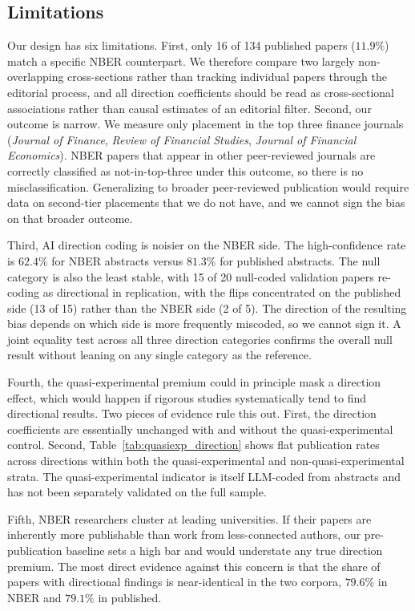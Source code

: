 \documentclass[12pt]{article}
\newcommand{\JF}{\textit{Journal of Finance}}
\newcommand{\RFS}{\textit{Review of Financial Studies}}
\newcommand{\JFE}{\textit{Journal of Financial Economics}}
\begin{document}
\subsection{Limitations}
\label{subsec:limitations}

Our design has six limitations.  First, only 16 of 134
published papers ($11.9\%$) match a specific NBER counterpart.  We
therefore compare two largely non-overlapping cross-sections rather
than tracking individual papers through the editorial process, and
all direction coefficients should be read as cross-sectional
associations rather than causal estimates of an editorial filter.
Second, our outcome is narrow.  We measure only placement in the top
three finance journals (\JF{}, \RFS{}, \JFE{}).  NBER papers that appear
in other peer-reviewed journals are correctly classified as
not-in-top-three under this outcome, so there is no
misclassification.  Generalizing to broader peer-reviewed
publication would require data on second-tier placements that we do
not have, and we cannot sign the bias on that broader outcome.

Third, AI direction coding is noisier on the NBER side.
The high-confidence rate is $62.4\%$ for NBER abstracts versus
$81.3\%$ for published abstracts.  The null category is also the
least stable, with 15 of 20 null-coded validation papers re-coding as
directional in replication, with the flips concentrated on the
published side (13 of 15) rather than the NBER side (2 of 5).  The
direction of the resulting bias depends on which side is more
frequently miscoded, so we cannot sign it.  A joint equality test
across all three direction categories confirms the overall null
result without leaning on any single category as the reference.

Fourth, the quasi-experimental premium could in principle
mask a direction effect, which would happen if rigorous studies
systematically tend to find directional results.  Two pieces of
evidence rule this out.  First, the direction coefficients are
essentially unchanged with and without the quasi-experimental
control.  Second, Table~\ref{tab:quasiexp_direction} shows flat
publication rates across directions within both the
quasi-experimental and non-quasi-experimental strata.  The
quasi-experimental indicator is itself LLM-coded from abstracts and
has not been separately validated on the full sample.

Fifth, NBER researchers cluster at leading universities.
If their papers are inherently more publishable than work from
less-connected authors, our pre-publication baseline sets a high
bar and would understate any true direction premium.  The most
direct evidence against this concern is that the share of papers
with directional findings is near-identical in the two corpora,
$79.6\%$ in NBER and $79.1\%$ in published.
\end{document}
